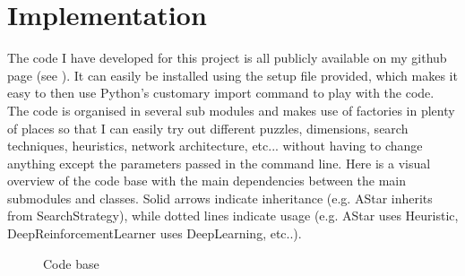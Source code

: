 
\chapter{Implementation} %

\label{sec:Implementation} %



The code I have developed for this project is all publicly available on my github page (see \cite{FB}). It can easily be installed using the setup file provided, which makes it easy to then use Python's customary import command to play with the code.
The code is organised in several sub modules and makes use of factories in plenty of places so that I can easily try out different puzzles, dimensions, search techniques, heuristics, network architecture, etc... without having to change anything except the parameters passed in the command line. Here is a visual overview of the code base with the main dependencies between the main submodules and classes. Solid arrows indicate inheritance (e.g. AStar inherits from SearchStrategy), while dotted lines indicate usage (e.g. AStar uses Heuristic, DeepReinforcementLearner uses DeepLearning, etc..).



\begin{figure}[H]
  \noindent
  \caption[Codebase]{Code base}
  \label{fig:Codebase}
\end{figure}


